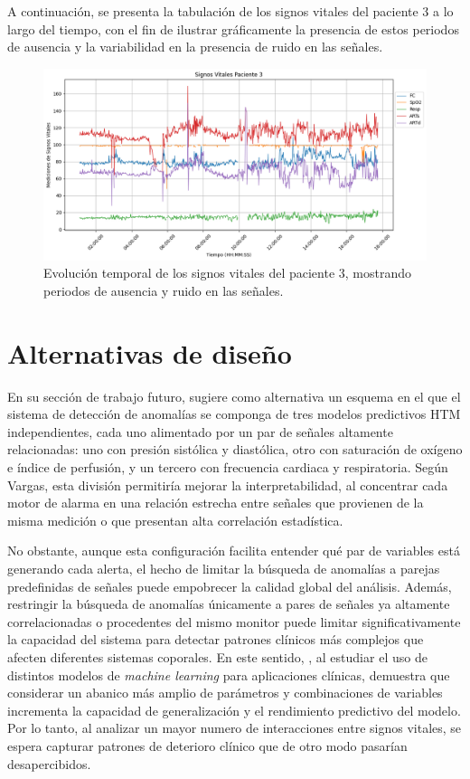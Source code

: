 A continuación, se presenta la tabulación de los signos vitales del paciente 3 a lo largo del tiempo, con el fin de ilustrar gráficamente la presencia de estos periodos de ausencia y la variabilidad en la presencia de ruido en las señales.

\begin{figure}[ht]
  \centering
  \includegraphics[width=\textwidth]{Images/SignosVitalesPaciente3.png}
  \caption{Evolución temporal de los signos vitales del paciente 3, mostrando periodos de ausencia y ruido en las señales.}
  \label{fig:signos_vitales_paciente3}
\end{figure}

\section{Alternativas de diseño}

En su sección de trabajo futuro, \textcite{Vargas2023} sugiere como alternativa un esquema en el que el sistema de detección de anomalías se componga de tres modelos predictivos HTM independientes, cada uno alimentado por un par de señales altamente relacionadas: uno con presión sistólica y diastólica, otro con saturación de oxígeno e índice de perfusión, y un tercero con frecuencia cardiaca y respiratoria. Según Vargas, esta división permitiría mejorar la interpretabilidad, al concentrar cada motor de alarma en una relación estrecha entre señales que provienen de la misma medición o que presentan alta correlación estadística.

No obstante, aunque esta configuración facilita entender qué par de variables está generando cada alerta, el hecho de limitar la búsqueda de anomalías a parejas predefinidas de señales puede empobrecer la calidad global del análisis. Además, restringir la búsqueda de anomalías únicamente a pares de señales ya altamente correlacionadas o procedentes del mismo monitor puede limitar significativamente la capacidad del sistema para detectar patrones clínicos más complejos que afecten diferentes sistemas coporales. En este sentido, \textcite{Pieroni2023}, al estudiar el uso de distintos modelos de \textit{machine learning} para aplicaciones clínicas, demuestra que considerar un abanico más amplio de parámetros y combinaciones de variables incrementa la capacidad de generalización y el rendimiento predictivo del modelo. Por lo tanto, al analizar un mayor numero de interacciones entre signos vitales, se espera capturar patrones de deterioro clínico que de otro modo pasarían desapercibidos.

